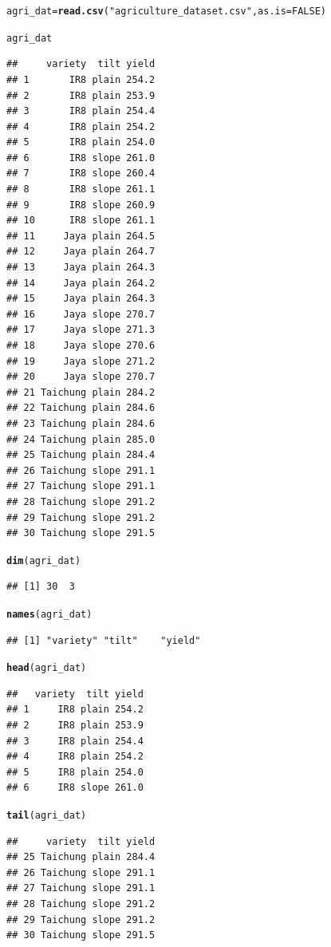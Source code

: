 \documentclass[11pt, a4paper]{article}\usepackage[]{graphicx}\usepackage[dvipsnames]{xcolor}
\makeatletter
\newcommand{\hlnum}[1]{\textcolor[rgb]{0.686,0.059,0.569}{#1}}%
\newcommand{\hlstr}[1]{\textcolor[rgb]{0.192,0.494,0.8}{#1}}%
\newcommand{\hlstd}[1]{\textcolor[rgb]{0.345,0.345,0.345}{#1}}%
\newcommand{\hlkwb}[1]{\textcolor[rgb]{0.69,0.353,0.396}{#1}}%
\newcommand{\hlkwc}[1]{\textcolor[rgb]{0.333,0.667,0.333}{#1}}%
\newcommand{\hlkwd}[1]{\textcolor[rgb]{0.737,0.353,0.396}{\textbf{#1}}}%
\newenvironment{kframe}{%
 \def\at@end@of@kframe{}%
 \ifinner\ifhmode%
  \def\at@end@of@kframe{\end{minipage}}%
  \begin{minipage}{\columnwidth}%
 \fi\fi%
 \def\FrameCommand##1{\hskip\@totalleftmargin \hskip-\fboxsep
 \colorbox{shadecolor}{##1}\hskip-\fboxsep
     \hskip-\linewidth \hskip-\@totalleftmargin \hskip\columnwidth}%
 \MakeFramed {\advance\hsize-\width
   \@totalleftmargin\z@ \linewidth\hsize
   \@setminipage}}%
 {\par\unskip\endMakeFramed%
 \at@end@of@kframe}
\newenvironment{knitrout}{}{} %
\makeatother
\begin{document}
\begin{knitrout}
\color{fgcolor}\begin{kframe}
\begin{alltt}
\hlstd{agri_dat} \hlkwb{=} \hlkwd{read.csv}\hlstd{(}\hlstr{"agriculture_dataset.csv"}\hlstd{,} \hlkwc{as.is} \hlstd{=} \hlnum{FALSE}\hlstd{)}

\hlstd{agri_dat}
\end{alltt}
\begin{verbatim}
##     variety  tilt yield
## 1       IR8 plain 254.2
## 2       IR8 plain 253.9
## 3       IR8 plain 254.4
## 4       IR8 plain 254.2
## 5       IR8 plain 254.0
## 6       IR8 slope 261.0
## 7       IR8 slope 260.4
## 8       IR8 slope 261.1
## 9       IR8 slope 260.9
## 10      IR8 slope 261.1
## 11     Jaya plain 264.5
## 12     Jaya plain 264.7
## 13     Jaya plain 264.3
## 14     Jaya plain 264.2
## 15     Jaya plain 264.3
## 16     Jaya slope 270.7
## 17     Jaya slope 271.3
## 18     Jaya slope 270.6
## 19     Jaya slope 271.2
## 20     Jaya slope 270.7
## 21 Taichung plain 284.2
## 22 Taichung plain 284.6
## 23 Taichung plain 284.6
## 24 Taichung plain 285.0
## 25 Taichung plain 284.4
## 26 Taichung slope 291.1
## 27 Taichung slope 291.1
## 28 Taichung slope 291.2
## 29 Taichung slope 291.2
## 30 Taichung slope 291.5
\end{verbatim}
\begin{alltt}
\hlkwd{dim}\hlstd{(agri_dat)}
\end{alltt}
\begin{verbatim}
## [1] 30  3
\end{verbatim}
\begin{alltt}
\hlkwd{names}\hlstd{(agri_dat)}
\end{alltt}
\begin{verbatim}
## [1] "variety" "tilt"    "yield"
\end{verbatim}
\begin{alltt}
\hlkwd{head}\hlstd{(agri_dat)}
\end{alltt}
\begin{verbatim}
##   variety  tilt yield
## 1     IR8 plain 254.2
## 2     IR8 plain 253.9
## 3     IR8 plain 254.4
## 4     IR8 plain 254.2
## 5     IR8 plain 254.0
## 6     IR8 slope 261.0
\end{verbatim}
\begin{alltt}
\hlkwd{tail}\hlstd{(agri_dat)}
\end{alltt}
\begin{verbatim}
##     variety  tilt yield
## 25 Taichung plain 284.4
## 26 Taichung slope 291.1
## 27 Taichung slope 291.1
## 28 Taichung slope 291.2
## 29 Taichung slope 291.2
## 30 Taichung slope 291.5
\end{verbatim}
\end{kframe}
\end{knitrout}
\end{document}
